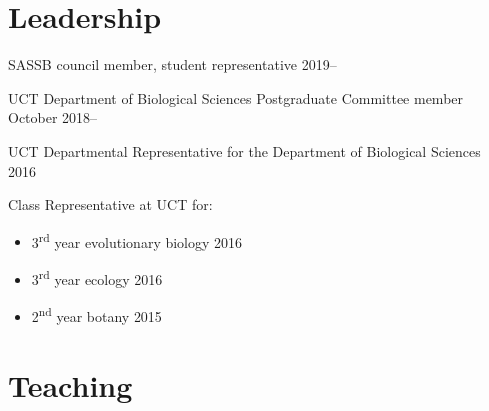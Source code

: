 \documentclass[10pt]{article}
\begin{document}
\section*{Leadership} %

SASSB council member, student representative              \hfill {\small 2019--}

UCT Department of Biological Sciences Postgraduate Committee member
                                                 \hfill {\small  October 2018--}

UCT Departmental Representative for the Department of Biological Sciences
                                                            \hfill {\small 2016}

Class Representative at UCT for:

\begin{itemize}[noitemsep, nolistsep]
  \item 3\textsuperscript{rd} year evolutionary biology     \hfill {\small 2016}
  \item 3\textsuperscript{rd} year ecology                  \hfill {\small 2016}
  \item 2\textsuperscript{nd} year botany                   \hfill {\small 2015}
\end{itemize}

\section*{Teaching} %

\end{document}
